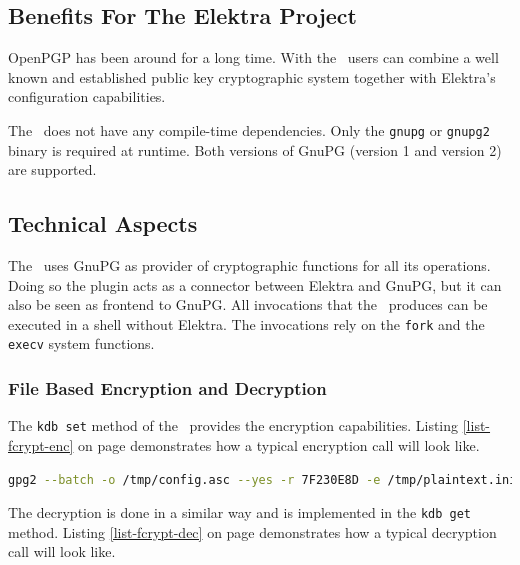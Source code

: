 \subsection{Benefits For The Elektra Project}

OpenPGP has been around for a long time.
With the \fcrypt ~users can combine a well known and established public key cryptographic system together with Elektra's configuration capabilities.

The \fcrypt ~does not have any compile-time dependencies.
Only the \texttt{gnupg} or \texttt{gnupg2} binary is required at runtime.
Both versions of GnuPG (version 1 and version 2) are supported.

%

\subsection{Technical Aspects}

The \fcrypt ~uses GnuPG as provider of cryptographic functions for all its operations.
Doing so the plugin acts as a connector between Elektra and GnuPG, but it can also be seen as frontend to GnuPG.
All invocations that the \fcrypt ~produces can be executed in a shell without Elektra.
The invocations rely on the \texttt{fork} and the \texttt{execv} system functions.

\subsubsection{File Based Encryption and Decryption}

The \texttt{kdb set} method of the \fcrypt ~provides the encryption capabilities.
Listing \ref{list-fcrypt-enc} on page \pageref{list-fcrypt-enc} demonstrates how a typical encryption call will look like.

\begin{lstlisting}[label=list-fcrypt-enc,language=Bash,caption={Fcrypt: encryption command}]
gpg2 --batch -o /tmp/config.asc --yes -r 7F230E8D -e /tmp/plaintext.ini
\end{lstlisting}

The decryption is done in a similar way and is implemented in the \texttt{kdb get} method.
Listing \ref{list-fcrypt-dec} on page \pageref{list-fcrypt-dec} demonstrates how a typical decryption call will look like.

